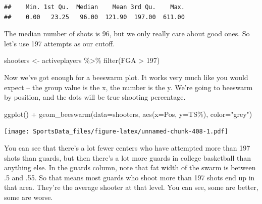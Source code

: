 \documentclass[
]{book}
\newenvironment{Shaded}{\begin{snugshade}}{\end{snugshade}}
\newcommand{\AttributeTok}[1]{\textcolor[rgb]{0.77,0.63,0.00}{#1}}
\newcommand{\DecValTok}[1]{\textcolor[rgb]{0.00,0.00,0.81}{#1}}
\newcommand{\FunctionTok}[1]{\textcolor[rgb]{0.00,0.00,0.00}{#1}}
\newcommand{\NormalTok}[1]{#1}
\newcommand{\OtherTok}[1]{\textcolor[rgb]{0.56,0.35,0.01}{#1}}
\newcommand{\SpecialCharTok}[1]{\textcolor[rgb]{0.00,0.00,0.00}{#1}}
\newcommand{\StringTok}[1]{\textcolor[rgb]{0.31,0.60,0.02}{#1}}
\begin{document}
\begin{Shaded}
\end{Shaded}

\begin{verbatim}
##    Min. 1st Qu.  Median    Mean 3rd Qu.    Max. 
##    0.00   23.25   96.00  121.90  197.00  611.00
\end{verbatim}

The median number of shots is 96, but we only really care about good ones. So let's use 197 attempts as our cutoff.

\begin{Shaded}
\begin{Highlighting}[]
\NormalTok{shooters }\OtherTok{\textless{}{-}}\NormalTok{ activeplayers }\SpecialCharTok{\%\textgreater{}\%} \FunctionTok{filter}\NormalTok{(FGA }\SpecialCharTok{\textgreater{}} \DecValTok{197}\NormalTok{)}
\end{Highlighting}
\end{Shaded}

Now we've got enough for a beeswarm plot. It works very much like you would expect -- the group value is the x, the number is the y. We're going to beeswarm by position, and the dots will be true shooting percentage.

\begin{Shaded}
\begin{Highlighting}[]
\FunctionTok{ggplot}\NormalTok{() }\SpecialCharTok{+} \FunctionTok{geom\_beeswarm}\NormalTok{(}\AttributeTok{data=}\NormalTok{shooters, }\FunctionTok{aes}\NormalTok{(}\AttributeTok{x=}\NormalTok{Pos, }\AttributeTok{y=}\StringTok{\textasciigrave{}}\AttributeTok{TS\%}\StringTok{\textasciigrave{}}\NormalTok{), }\AttributeTok{color=}\StringTok{"grey"}\NormalTok{)}
\end{Highlighting}
\end{Shaded}

\texttt{[image: SportsData\_files/figure-latex/unnamed-chunk-408-1.pdf]}

You can see that there's a lot fewer centers who have attempted more than 197 shots than guards, but then there's a lot more guards in college basketball than anything else. In the guards column, note that fat width of the swarm is between .5 and .55. So that means most guards who shoot more than 197 shots end up in that area. They're the average shooter at that level. You can see, some are better, some are worse.
\end{document}

